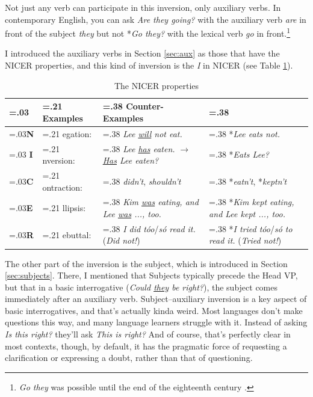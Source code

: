 Not just any verb can participate in this inversion, only auxiliary verbs. In contemporary English, you can ask \textit{Are they going?} with the auxiliary verb \textit{are} in front of the subject \textit{they} but not *\textit{Go they?} with the lexical verb \textit{go} in front.\footnote{\textit{Go they} was possible until the end of the eighteenth century \citep[239]{Lass1999}.}

I introduced the auxiliary verbs in Section \ref{sec:aux} as those that have the NICER properties, and this kind of inversion is the \textit{I} in NICER (see Table \ref{tab:NICER2}).

\begin{table}
    \centering
    \begin{tabularx}{0.80\textwidth}{@{} >{\centering\arraybackslash\hsize=.03\hsize}X >{\hsize=.21\hsize}X >{\hsize=.38\hsize}X >{\hsize=.38\hsize}X @{}}
    \multicolumn{2}{>{\hsize=.24\hsize}X}{\textbf{Feature}} & \textbf{Examples} & \textbf{Counter-Examples} \\
    \hline
    \textbf{N} & egation:& \textit{Lee \uline{will} not eat.} & *\textit{Lee eats not.} \\
    \rowcolor{gray!20} %
    \textbf{I} & nversion:& \textit{Lee \uline{has} eaten.} \(\rightarrow\) \newline \textit{\uline{Has} Lee eaten?} & *\textit{Eats Lee?} \\
    \textbf{C} & ontraction:& \textit{didn't}, \textit{shouldn't} & *\textit{eatn't}, *\textit{keptn't} \\
    \textbf{E} & llipsis:& \textit{Kim \uline{was} eating, and \newline Lee \uline{was} ..., too.} & *\textit{Kim kept eating, and \newline Lee kept ..., too.} \\
    \textbf{R} & ebuttal:& \textit{I did tóo}/\textit{só read it.} \newline (\textit{Did not!}) & *\textit{I tried tóo}/\textit{só to read it.} (\textit{Tried not!}) \\
\end{tabularx}
\caption{The NICER properties}\label{tab:NICER2}
\end{table}

The other part of the inversion is the subject, which is introduced in Section \ref{sec:subjects}. There, I mentioned that \textsf{Subjects} typically precede the \textsf{Head} VP, but that in a basic interrogative (\textit{Could \uline{they} be right?}), the subject comes immediately after an auxiliary verb. \textsf{Subject}--auxiliary inversion is a key aspect of basic interrogatives, and that's actually kinda weird. Most languages don't make questions this way, and many language learners struggle with it. Instead of asking \textit{Is this right?} they'll ask \textit{This is right?} And of course, that's perfectly clear in most contexts, though, by default, it has the pragmatic force of requesting a clarification or expressing a doubt, rather than that of questioning.

